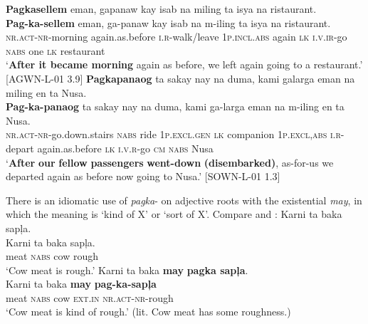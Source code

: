 \ea
\label{bkm:Ref447656201}
\textbf{Pagkasellem}  eman,  gapanaw  kay  isab na miling  ta  isya  na  ristaurant. \\\smallskip
 \gll \textbf{Pag-ka-sellem}  eman,  ga-panaw  kay  isab\footnotemark{}  na m-iling  ta  isya  na  ristaurant. \\
\textsc{nr.act-nr}-morning  again.as.before \textsc{i.r}-walk/leave  1\textsc{p.incl.abs}  again  \textsc{lk} \textsc{i.v.ir}-go  \textsc{nabs}  one  \textsc{lk}  restaurant \\
\glt `\textbf{After it became morning} again as before, we left again going to a restaurant.’ [AGWN-L-01 3.9]
\z
\ea
\textbf{Pagkapanaog}  ta  sakay  nay  na  duma, kami  galarga  eman   na  miling  en   ta  Nusa. \\\smallskip
 \gll \textbf{Pag-ka-panaog}  ta  sakay  nay  na  duma, kami  ga-larga  eman   na  m-iling  en   ta  Nusa. \\
\textsc{nr.act-nr}-go.down.stairs  \textsc{nabs}  ride  1\textsc{p.excl.gen}  \textsc{lk}  companion
1\textsc{p.excl,abs}  \textsc{i.r}-depart  again.as.before  \textsc{lk}  \textsc{i.v.r}-go  \textsc{cm}  \textsc{nabs}  Nusa \\
\glt ‘\textbf{After} \textbf{our} \textbf{fellow} \textbf{passengers} \textbf{went-down} \textbf{(disembarked)}, as-for-us we departed again as before now going to Nusa.’ [SOWN-L-01 1.3]
\z

There is an idiomatic use of \textit{pagka}{}- on adjective roots with the existential \textit{may}, in which the meaning is ‘kind of X’ or ‘sort of X’.  Compare  and :
\ea 
    \ea 
      \label{ex:rough}
        Karni  ta  baka  sapļa. \\\smallskip
 \gll Karni  ta  baka  sapļa. \\
          meat  \textsc{nabs}  cow  rough \\
        \glt ‘Cow meat is rough.’
    \ex
        \label{ex:roughness}
        Karni  ta  baka  \textbf{may}    \textbf{pagka sapļa}. \\\smallskip
 \gll Karni  ta  baka  \textbf{may}    \textbf{pag-ka-sapļa} \\
        meat  \textsc{nabs}  cow  \textsc{ext.in}  \textsc{nr.act-nr-}rough \\
        \glt ‘Cow meat is kind of rough.’ (lit.  Cow meat has some roughness.)
    \z
\z


